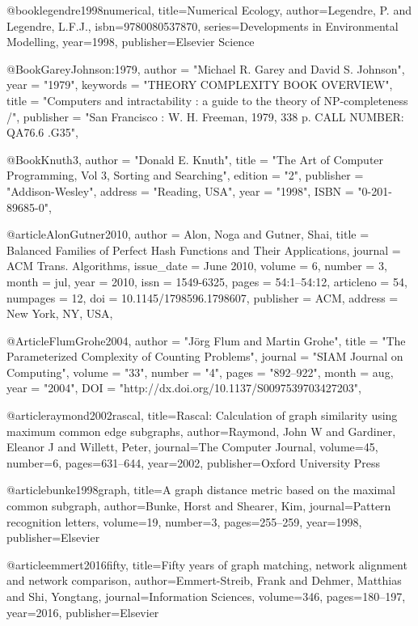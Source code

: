 @book{legendre1998numerical,
  title={Numerical Ecology},
  author={Legendre, P. and Legendre, L.F.J.},
  isbn={9780080537870},
  series={Developments in Environmental Modelling},
  year={1998},
  publisher={Elsevier Science}
}

@Book{GareyJohnson:1979,
  author =	"Michael R. Garey and David S. Johnson",
  year = 	"1979",
  keywords =	"THEORY COMPLEXITY BOOK OVERVIEW",
  title =	"Computers and intractability : a guide to the theory
		 of {NP}-completeness /",
  publisher =	"San Francisco : W. H. Freeman, 1979, 338 p. CALL
		 NUMBER: QA76.6 .G35",
}


@Book{Knuth3,
  author =	"Donald E. Knuth",
  title =	"The Art of Computer Programming, Vol 3, Sorting and
		 Searching",
  edition =	"2",
  publisher =	"Addison-Wesley",
  address =	"Reading, USA",
  year = 	"1998",
  ISBN = 	"0-201-89685-0",
}

@article{AlonGutner2010,
 author = {Alon, Noga and Gutner, Shai},
 title = {Balanced Families of Perfect Hash Functions and Their Applications},
 journal = {ACM Trans. Algorithms},
 issue_date = {June 2010},
 volume = {6},
 number = {3},
 month = jul,
 year = {2010},
 issn = {1549-6325},
 pages = {54:1--54:12},
 articleno = {54},
 numpages = {12},
 doi = {10.1145/1798596.1798607},
 publisher = {ACM},
 address = {New York, NY, USA},
} 

@Article{FlumGrohe2004,
  author =	"J{\"o}rg Flum and Martin Grohe",
  title =	"The Parameterized Complexity of Counting Problems",
  journal =	"SIAM Journal on Computing",
  volume =	"33",
  number =	"4",
  pages =	"892--922",
  month =	aug,
  year = 	"2004",
  DOI =  	"http://dx.doi.org/10.1137/S0097539703427203",
}

@article{raymond2002rascal,
  title={Rascal: Calculation of graph similarity using maximum common edge subgraphs},
  author={Raymond, John W and Gardiner, Eleanor J and Willett, Peter},
  journal={The Computer Journal},
  volume={45},
  number={6},
  pages={631--644},
  year={2002},
  publisher={Oxford University Press}
}

@article{bunke1998graph,
  title={A graph distance metric based on the maximal common subgraph},
  author={Bunke, Horst and Shearer, Kim},
  journal={Pattern recognition letters},
  volume={19},
  number={3},
  pages={255--259},
  year={1998},
  publisher={Elsevier}
}

@article{emmert2016fifty,
  title={Fifty years of graph matching, network alignment and network comparison},
  author={Emmert-Streib, Frank and Dehmer, Matthias and Shi, Yongtang},
  journal={Information Sciences},
  volume={346},
  pages={180--197},
  year={2016},
  publisher={Elsevier}
}

